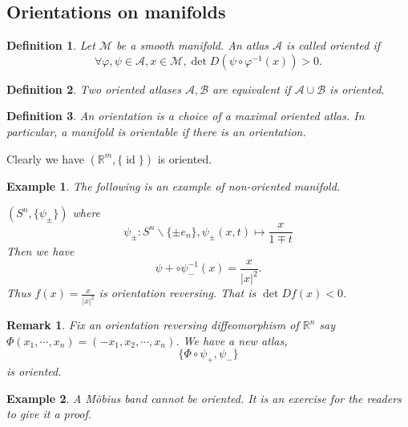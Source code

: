 \documentclass[8pt]{article}
\newtheorem{definition}{Definition}[section]
\newtheorem{remark}{Remark}[section]
\newtheorem{example}{Example}[section]
\DeclareMathOperator{\id}{id}
\newcommand{\R}[0]{\mathbb{R}}
\newcommand{\M}[0]{\mathcal{M}}
\begin{document}
\subsection{Orientations on manifolds}

\begin{definition}
  Let $\M$ be a smooth manifold. An atlas $\mathscr{A}$ is called oriented if 
  \begin{equation*}
    \forall\varphi,\psi\in\mathscr{A},x\in\M,\det D(\psi\circ\varphi^{-1}(x))>0.
  \end{equation*}
\end{definition}

\begin{definition}
  Two oriented atlases $\mathscr{A},\mathscr{B}$ are equivalent if $\mathscr{A}\cup\mathscr{B}$ is oriented.
\end{definition}

\begin{definition}
  An orientation is a choice of a maximal oriented atlas. In particular, a manifold is orientable if there is an orientation.
\end{definition}

Clearly we have $(\R^m,\{\id\})$ is oriented. 

\begin{example}The following is an example of non-oriented manifold.
    \item $(S^n,\{\psi_{\pm}\})$ where 
    \begin{equation*}
    \psi_\pm:S^n\backslash\{\pm e_n\},\psi_\pm(x,t)\mapsto {\frac x {1\mp t}}
    \end{equation*}
    Then we have 
    \begin{equation*}
    \psi+\circ\psi_-^{-1}(x) = {\frac x {\vert x\vert^2}}.
    \end{equation*}
    Thus $f(x) = {\frac x {\vert x\vert^2}}$ is orientation reversing. That is $\det Df(x)<0$.
\end{example}

\begin{remark}
  Fix an orientation reversing diffeomorphism of $\R^n$ say $\Phi(x_1,\cdots,x_n) = (-x_1,x_2,\cdots,x_n)$. We have a new atlas,
  \begin{equation*}
  \{\Phi\circ\psi_+,\psi_-\}
  \end{equation*}
  is oriented.
\end{remark}

\begin{example}
  A Möbius band cannot be oriented. It is an exercise for the readers to give it a proof.
\end{example}
\end{document}
